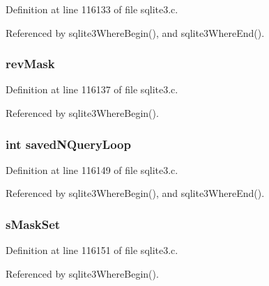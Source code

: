 Definition at line 116133 of file sqlite3.\+c.



Referenced by sqlite3\+Where\+Begin(), and sqlite3\+Where\+End().

\hypertarget{struct_where_info_ab8ca9736ce631551a49e193b3bfbc8dc}{}
\subsubsection[{rev\+Mask}]{ rev\+Mask}\label{struct_where_info_ab8ca9736ce631551a49e193b3bfbc8dc}


Definition at line 116137 of file sqlite3.\+c.



Referenced by sqlite3\+Where\+Begin().

\hypertarget{struct_where_info_af689a27f89f0be772017cb104cde4636}{}
\subsubsection[{saved\+N\+Query\+Loop}]{\setlength{\rightskip}{0pt plus 5cm}int saved\+N\+Query\+Loop}\label{struct_where_info_af689a27f89f0be772017cb104cde4636}


Definition at line 116149 of file sqlite3.\+c.



Referenced by sqlite3\+Where\+Begin(), and sqlite3\+Where\+End().

\hypertarget{struct_where_info_aec482a9955c074b06f8e4281b8d81ebf}{}
\subsubsection[{s\+Mask\+Set}]{ s\+Mask\+Set}\label{struct_where_info_aec482a9955c074b06f8e4281b8d81ebf}


Definition at line 116151 of file sqlite3.\+c.



Referenced by sqlite3\+Where\+Begin().

\hypertarget{struct_where_info_ad4c414c8a8cc2a3daa12a1d54f54bbbf}{}
